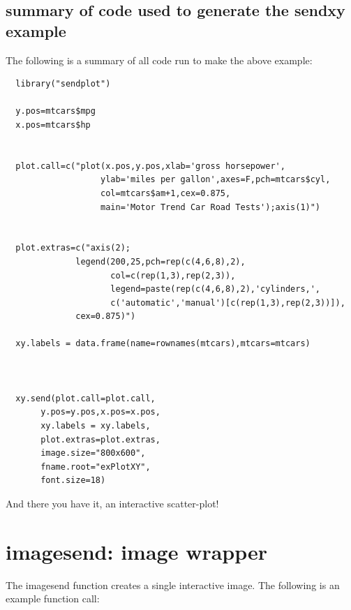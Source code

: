 \documentclass[]{article}
\begin{document}
\subsection{summary of code used to generate the sendxy example}

 The following is a summary of all code run to make the above example:

\begin{verbatim}
  library("sendplot")

  y.pos=mtcars$mpg
  x.pos=mtcars$hp

	 
  plot.call=c("plot(x.pos,y.pos,xlab='gross horsepower',
                   ylab='miles per gallon',axes=F,pch=mtcars$cyl,
                   col=mtcars$am+1,cex=0.875,
                   main='Motor Trend Car Road Tests');axis(1)")


  plot.extras=c("axis(2);
              legend(200,25,pch=rep(c(4,6,8),2),
                     col=c(rep(1,3),rep(2,3)),
                     legend=paste(rep(c(4,6,8),2),'cylinders,',
                     c('automatic','manual')[c(rep(1,3),rep(2,3))]),
              cex=0.875)")

  xy.labels = data.frame(name=rownames(mtcars),mtcars=mtcars)


 
  xy.send(plot.call=plot.call,
       y.pos=y.pos,x.pos=x.pos,
       xy.labels = xy.labels, 
       plot.extras=plot.extras,
       image.size="800x600",
       fname.root="exPlotXY",
       font.size=18)

\end{verbatim}


And there you have it, an interactive scatter-plot! 

\newpage




























\section{imagesend: image wrapper}

The imagesend function creates a single interactive image. The following is an example function call: 
\end{document}
